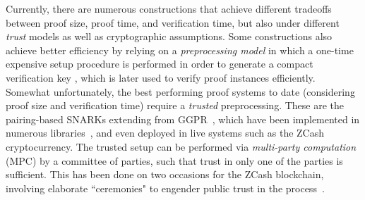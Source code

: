 Currently, there are numerous constructions that achieve different tradeoffs between proof size, proof time, and verification time, but also under different \emph{trust} models as well as cryptographic assumptions. %
Some constructions also achieve better efficiency by relying on a \emph{preprocessing model} in which a one-time expensive setup procedure is performed in order to generate a compact verification key , which is later used to verify proof instances efficiently.
Somewhat unfortunately, the best performing proof systems to date (considering proof size and verification time) require a \emph{trusted} preprocessing. These are the pairing-based SNARKs extending from GGPR~\cite{EC:GGPR13,ES:SBVBPW13,TCC:BCIOP13,C:BCGTV13,EC:Groth16}, which have been implemented in numerous libraries~\cite{C:BCGTV13,bellman}, and even deployed in live systems such as the ZCash~\cite{Zcash} cryptocurrency.
The trusted setup can be performed via \emph{multi-party computation} (MPC) by a committee of parties, such that trust in only one of the parties is sufficient. This has been done on two occasions for the ZCash blockchain, involving elaborate ``ceremonies" to engender public trust in the process~\cite{ZcashCeremony}. 

